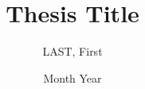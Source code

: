 \documentclass[12pt]{report}
\title{Thesis Title}
\author{LAST, First}
\date{Month Year}
\begin{document}
\ifXeTeX
\else\fi
\clearpage
\pagestyle{main}



% 

\begin{singlespacing}
	
	\addbibtotoc%
	
\end{singlespacing}
\end{document}
